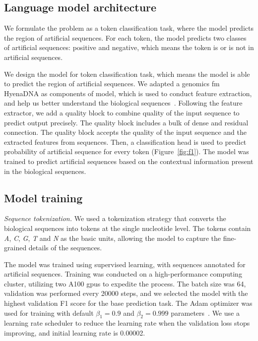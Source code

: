 \documentclass[pdflatex, sn-mathphys-num, lineno]{sn-jnl}%
\theoremstyle{thmstyleone}%
\theoremstyle{thmstyletwo}%
\theoremstyle{thmstylethree}%
\begin{document}
\subsection{Language model architecture}\label{ssec:lm}

We formulate the problem as a token classification task, where the model predicts the region of artificial sequences.
For each token, the model predicts two classes of artificial sequences: positive and negative, which means the token is or is not in artificial sequences.

We design the model for token classification task, which means the model is able to predict the region of artificial sequences.
We adapted a genomics \gls{fm} HyenaDNA as components of model, which is used to conduct feature extraction, and help us better understand the biological sequences~\cite{nguyen2024hyenadna}.
Following the feature extractor, we add a quality block to combine quality of the input sequence to predict output precisely.
The quality block includes a bulk of dense and residual connection.
The quality block accepts the quality of the input sequence and the extracted features from sequences.
Then, a classification head is used to predict probability of artificial sequence for every token (Figure~\ref{fig:f1}).
The model was trained to predict  artificial sequences based on the contextual information present in the biological sequences.

\subsection{Model training}\label{ssec:training}

\textit{Sequence tokenization.} We used a tokenization strategy that converts the biological sequences into tokens at the single nucleotide level.
The tokens contain \emph{A}, \emph{C}, \emph{G}, \emph{T} and \emph{N} as the basic units, allowing the model to capture the fine-grained details of the sequences.

The model was trained using supervised learning, with sequences annotated for artificial sequences.
Training was conducted on a high-performance computing cluster, utilizing two A100 \glspl{gpu} to expedite the process.
The batch size was \num{64}, validation was performed every \num{20000} steps, and we selected the model with the highest validation F1 score for the base prediction task.
The Adam optimizer was used for training with default \( \beta_{1} = 0.9 \) and \( \beta_{2} = 0.999 \) parameters~\cite{kingma2014adam}.
We use a learning rate scheduler to reduce the learning rate when the validation loss stops improving, and initial learning rate is \num{0.00002}.
\end{document}
